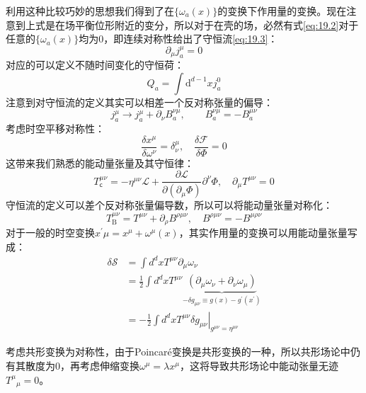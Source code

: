 利用这种比较巧妙的思想我们得到了在$\{\omega_a(x)\}$的变换下作用量的变换。现在注意到上式是在场平衡位形附近的变分，所以对于在壳的场，必然有式\ref{eq:19.2}对于任意的$\{\omega_a(x)\}$均为0，即连续对称性给出了守恒流\ref{eq:19.3}：
\begin{equation}
	\boxed{\partial_\mu j^\mu_a=0}
\end{equation}
对应的可以定义不随时间变化的守恒荷：
\begin{equation}
	Q_a=\int\mathrm{d}^{d-1}xj_a^0
\end{equation}
注意到对守恒流的定义其实可以相差一个反对称张量的偏导：
\[
	j_a^\mu\to j_a^\mu+\partial_\nu B_a^{\nu\mu},\quad\quad B_a^{\nu\mu}=-B_a^{\mu\nu}
\]
考虑时空平移对称性：
\[	
	\frac{\delta x^\mu}{\delta\omega^\nu}=\delta^\mu_\nu,\quad\frac{\delta\mathcal{F}}{\delta\Phi}=0
\]
这带来我们熟悉的能动量张量及其守恒律：
\begin{equation}
	\boxed{
		T_\mathsf{c}^{\mu\nu}=-\eta^{\mu\nu}\mathcal{L}+\frac{\partial\mathcal{L}}{\partial(\partial_\mu\Phi)}\partial^\nu\Phi ,\quad \partial_\mu T^{\mu\nu}=0
	}
\end{equation}
守恒流的定义可以差个反对称张量偏导数，所以可以将能动量张量对称化：
\begin{equation}
	T_\mathrm{B}^{\mu\nu}=T^{\mu\nu}+\partial_\rho B^{\rho\mu\nu},\quad B^{\rho\mu\nu}=-B^{\mu\rho\nu}
\end{equation}
对于一般的时空变换$x^{\prime}\mu=x^\mu+\omega^\mu(x)$，其实作用量的变换可以用能动量张量写成：
\begin{equation}\label{eq:19.8}
	\begin{aligned}
	\delta\mathcal{S}&=\int d^dxT^{\mu\nu}\partial_{\mu}\omega_{\nu}\\
		&=\frac{1}{2}\int d^dxT^{\mu\nu}\underbrace{\left(\partial_{\mu}\omega_{\nu}+\partial_{\nu}\omega_{\mu}\right)}_{-\delta g_{\mu\nu}\equiv g(x)-{g^\prime}(x^\prime)}\\
		&=\left.-\frac{1}{2}\int d^dxT^{\mu\nu}\delta g_{\mu\nu}\right|_{g^{\mu\nu}=\eta^{\mu\nu}}
	\end{aligned}
\end{equation}

考虑共形变换为对称性，由于Poincar\'e变换是共形变换的一种，所以共形场论中仍有其散度为0，再考虑伸缩变换$\omega^\mu=\lambda x^\mu$，这将导致共形场论中能动张量无迹${T^\mu}_{\mu}=0$。

